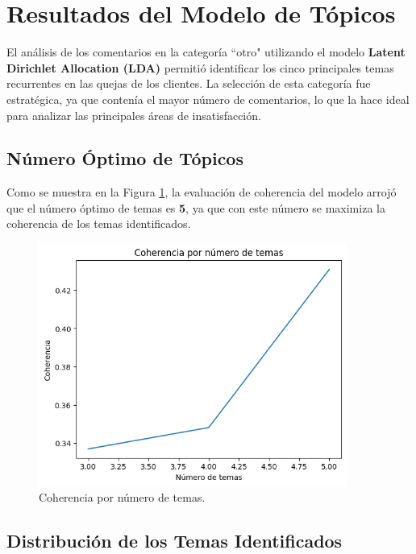 \documentclass{matematicasud}
\begin{document}
\newpage
\section{Resultados del Modelo de Tópicos}

El análisis de los comentarios en la categoría ``otro" utilizando el modelo \textbf{Latent Dirichlet Allocation (LDA)} permitió identificar los cinco principales temas recurrentes en las quejas de los clientes. La selección de esta categoría fue estratégica, ya que contenía el mayor número de comentarios, lo que la hace ideal para analizar las principales áreas de insatisfacción.

\subsection{Número Óptimo de Tópicos}

Como se muestra en la Figura \ref{fig:coherencia_temas}, la evaluación de coherencia del modelo arrojó que el número óptimo de temas es \textbf{5}, ya que con este número se maximiza la coherencia de los temas identificados.

\begin{figure}[h]
    \centering
    \includegraphics[width=0.9\textwidth]{imagec.png} %
    \caption{Coherencia por número de temas.}
    \label{fig:coherencia_temas}
\end{figure}


\subsection{Distribución de los Temas Identificados}
\end{document}
